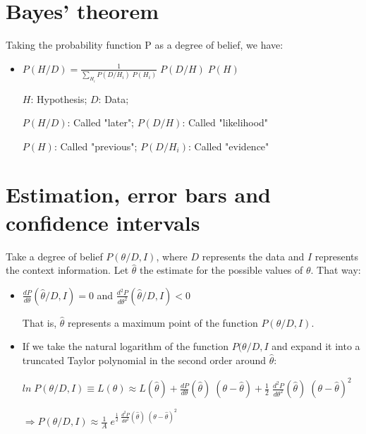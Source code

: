 \documentclass{article}
\begin{document}
\section{Bayes' theorem}

Taking the probability function P as a degree of belief, we have:

\begin{itemize}

\item $P(H/D) = \frac{1}{\sum\limits_{H_{i}} P(D/H_{i}) \; P(H_{i})} \; P(D/H) \; P(H)$

$H$: Hypothesis; $D$: Data;

$P(H/D)$: Called "later"; $P(D/H)$: Called "likelihood"

$P(H)$: Called "previous"; $P(D/H_{i})$: Called "evidence"

\end{itemize}

\section{Estimation, error bars and confidence intervals}

Take a degree of belief $P(\theta/D,I)$, where $D$ represents the data and $I$ represents the context information. Let $\hat{\theta}$ the estimate for the possible values of $\theta$. That way:

\begin{itemize}

\item $\frac{dP}{d\theta} (\hat{\theta}/D,I) = 0$ and $\frac{d^{2}P}{d\theta^{2}} (\hat{\theta}/D,I) < 0$

That is, $\hat{\theta}$ represents a maximum point of the function $P(\theta/D,I)$.

\item If we take the natural logarithm of the function $P(\theta/D,I$ and expand it into a truncated Taylor polynomial in the second order around $\hat{\theta}$:

$ln \; P(\theta/D,I) \equiv L(\theta) \approx L(\hat{\theta}) + \frac{dP}{d\theta} (\hat{\theta}) \; (\theta - \hat{\theta}) + \frac{1}{2} \; \frac{d^{2}P}{d\theta^{2}} (\hat{\theta}) \; (\theta - \hat{\theta})^{2}$

$\Rightarrow P(\theta/D,I) \approx \frac{1}{A} \; e^{\frac{1}{2} \; \frac{d^{2}P}{d\theta^{2}} (\hat{\theta}) \; (\theta - \hat{\theta})^{2}}$

\end{itemize}
\end{document}
